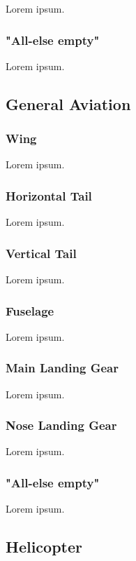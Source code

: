 Lorem ipsum.

\subsubsection{"All-else empty"}

Lorem ipsum.

\subsection{General Aviation}

\subsubsection{Wing}

Lorem ipsum.

\subsubsection{Horizontal Tail}

Lorem ipsum.

\subsubsection{Vertical Tail}

Lorem ipsum.

\subsubsection{Fuselage}

Lorem ipsum.

\subsubsection{Main Landing Gear}

Lorem ipsum.

\subsubsection{Nose Landing Gear}

Lorem ipsum.

\subsubsection{"All-else empty"}

Lorem ipsum.

\subsection{Helicopter}

